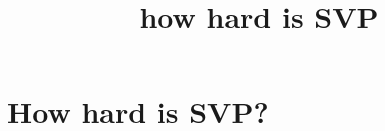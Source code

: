 \documentclass[11pt]{article}
\title{how hard is SVP}
\begin{document}
    
    \maketitle
    
    

    
    \section{How hard is SVP?}\label{how-hard-is-svp}


    
    
    
\end{document}
